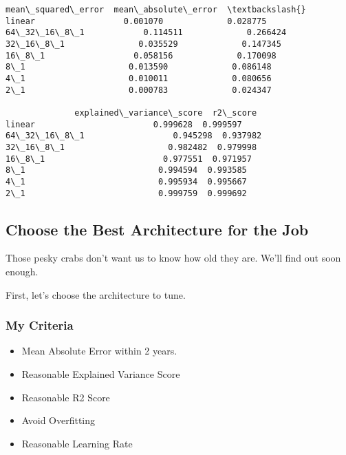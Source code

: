 \documentclass[11pt]{article}
\makeatletter
\providecommand{\tightlist}{%
      \setlength{\itemsep}{0pt}\setlength{\parskip}{0pt}}
\newcommand{\boxspacing}{\kern\kvtcb@left@rule\kern\kvtcb@boxsep}
\newcommand{\prompt}[4]{
        {\ttfamily\llap{{\color{#2}[#3]:\hspace{3pt}#4}}\vspace{-\baselineskip}}
    }
\makeatother
\begin{document}
            \begin{tcolorbox}[breakable, size=fbox, boxrule=.5pt, pad at break*=1mm, opacityfill=0]
\prompt{Out}{outcolor}{49}{\boxspacing}
\begin{Verbatim}[commandchars=\\\{\}]
              mean\_squared\_error  mean\_absolute\_error  \textbackslash{}
linear                  0.001070             0.028775
64\_32\_16\_8\_1            0.114511             0.266424
32\_16\_8\_1               0.035529             0.147345
16\_8\_1                  0.058156             0.170098
8\_1                     0.013590             0.086148
4\_1                     0.010011             0.080656
2\_1                     0.000783             0.024347

              explained\_variance\_score  r2\_score
linear                        0.999628  0.999597
64\_32\_16\_8\_1                  0.945298  0.937982
32\_16\_8\_1                     0.982482  0.979998
16\_8\_1                        0.977551  0.971957
8\_1                           0.994594  0.993585
4\_1                           0.995934  0.995667
2\_1                           0.999759  0.999692
\end{Verbatim}
\end{tcolorbox}
        
    \subsection{Choose the Best Architecture for the
Job}\label{choose-the-best-architecture-for-the-job}

Those pesky crabs don't want us to know how old they are. We'll find out
soon enough.

First, let's choose the architecture to tune.

\subsubsection{My Criteria}\label{my-criteria}

\begin{itemize}
\tightlist
\item
  Mean Absolute Error within 2 years.
\item
  Reasonable Explained Variance Score
\item
  Reasonable R2 Score
\item
  Avoid Overfitting
\item
  Reasonable Learning Rate
\end{itemize}
\end{document}
